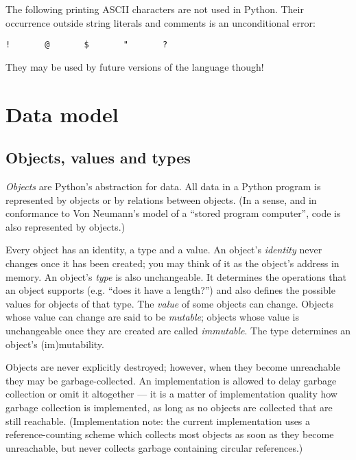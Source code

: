 The following printing ASCII characters are not used in Python.  Their
occurrence outside string literals and comments is an unconditional
error:

\begin{verbatim}
!       @       $       "       ?
\end{verbatim}

They may be used by future versions of the language though!

\chapter{Data model}

\section{Objects, values and types}

{\em Objects} are Python's abstraction for data.  All data in a Python
program is represented by objects or by relations between objects.
(In a sense, and in conformance to Von Neumann's model of a
``stored program computer'', code is also represented by objects.)

Every object has an identity, a type and a value.  An object's {\em
identity} never changes once it has been created; you may think of it
as the object's address in memory.  An object's {\em type} is also
unchangeable.  It determines the operations that an object supports
(e.g. ``does it have a length?'') and also defines the possible
values for objects of that type.  The {\em value} of some objects can
change.  Objects whose value can change are said to be {\em mutable};
objects whose value is unchangeable once they are created are called
{\em immutable}.  The type determines an object's (im)mutability.

Objects are never explicitly destroyed; however, when they become
unreachable they may be garbage-collected.  An implementation is
allowed to delay garbage collection or omit it altogether --- it is a
matter of implementation quality how garbage collection is
implemented, as long as no objects are collected that are still
reachable.  (Implementation note: the current implementation uses a
reference-counting scheme which collects most objects as soon as they
become unreachable, but never collects garbage containing circular
references.)

